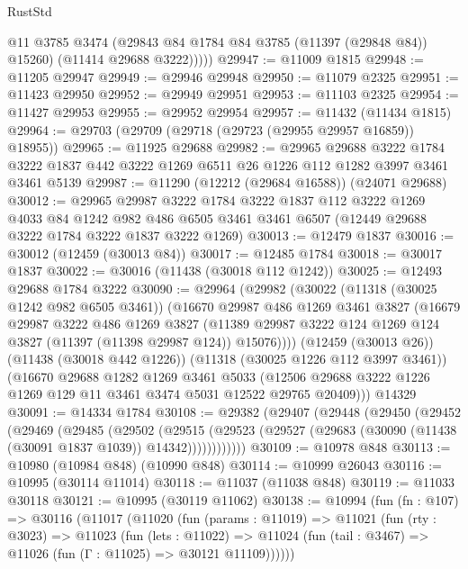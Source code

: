 \begin{lexlean}{RustStd}
\begin{coremodule}
            @11
            @3785
            @3474
            (@29843 @84 @1784 @84 @3785 (@11397 (@29848 @84)) @15260)
            (@11414 @29688 @3222)))))
@29947 := @11009 @1815
@29948 := @11205 @29947
@29949 := @29946 @29948
@29950 := @11079 @2325
@29951 := @11423 @29950
@29952 := @29949 @29951
@29953 := @11103 @2325
@29954 := @11427 @29953
@29955 := @29952 @29954
@29957 := @11432 (@11434 @1815)
@29964 := @29703 (@29709 (@29718 (@29723 (@29955 @29957 @16859)) @18955))
@29965 := @11925 @29688
@29982 := @29965
    @29688
    @3222
    @1784
    @3222
    @1837
    @442
    @3222
    @1269
    @6511
    @26
    @1226
    @112
    @1282
    @3997
    @3461
    @3461
    @5139
@29987 := @11290 (@12212 (@29684 @16588)) (@24071 @29688)
@30012 := @29965
    @29987
    @3222
    @1784
    @3222
    @1837
    @112
    @3222
    @1269
    @4033
    @84
    @1242
    @982
    @486
    @6505
    @3461
    @3461
    @6507
    (@12449 @29688 @3222 @1784 @3222 @1837 @3222 @1269)
@30013 := @12479 @1837
@30016 := @30012 (@12459 (@30013 @84))
@30017 := @12485 @1784
@30018 := @30017 @1837
@30022 := @30016 (@11438 (@30018 @112 @1242))
@30025 := @12493 @29688 @1784 @3222
@30090 := @29964
    (@29982
      (@30022
        (@11318 (@30025 @1242 @982 @6505 @3461))
        (@16670
          @29987
          @486
          @1269
          @3461
          @3827
          (@16679
            @29987
            @3222
            @486
            @1269
            @3827
            (@11389 @29987 @3222 @124 @1269 @124 @3827 (@11397 (@11398 @29987 @124)) @15076))))
      (@12459 (@30013 @26))
      (@11438 (@30018 @442 @1226))
      (@11318 (@30025 @1226 @112 @3997 @3461))
      (@16670
        @29688
        @1282
        @1269
        @3461
        @5033
        (@12506 @29688 @3222 @1226 @1269 @129 @11 @3461 @3474 @5031 @12522 @29765 @20409)))
    @14329
@30091 := @14334 @1784
@30108 := @29382
    (@29407
      (@29448
        (@29450
          (@29452
            (@29469
              (@29485
                (@29502
                  (@29515
                    (@29523 (@29527 (@29683 (@30090 (@11438 (@30091 @1837 @1039)) @14342))))))))))))
@30109 := @10978 @848
@30113 := @10980 (@10984 @848) (@10990 @848)
@30114 := @10999 @26043
@30116 := @10995 (@30114 @11014)
@30118 := @11037 (@11038 @848)
@30119 := @11033 @30118
@30121 := @10995 (@30119 @11062)
@30138 := @10994
    (fun (fn : @107) =>
    @30116
      (@11017
        (@11020
          (fun (params : @11019) =>
          @11021
            (fun (rty : @3023) =>
            @11023
              (fun (lets : @11022) =>
              @11024 (fun (tail : @3467) => @11026 (fun (Γ : @11025) => @30121 @11109))))))

\end{coremodule}
\end{lexlean}
